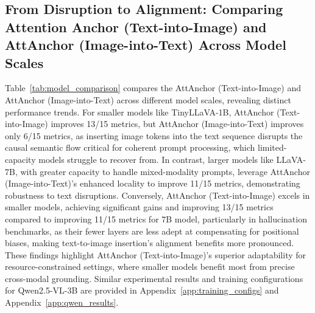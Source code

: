 \documentclass[11pt]{article}
\begin{document}
\subsection{From Disruption to Alignment: Comparing Attention Anchor (Text-into-Image) and AttAnchor (Image-into-Text) Across Model Scales}

Table~\ref{tab:model_comparison} compares the AttAnchor (Text-into-Image) and AttAnchor (Image-into-Text) across different model scales, revealing distinct performance trends. For smaller models like TinyLLaVA-1B, AttAnchor (Text-into-Image) improves 13/15 metrics, but AttAnchor (Image-into-Text) improves only 6/15 metrics, as inserting image tokens into the text sequence disrupts the causal semantic flow critical for coherent prompt processing, which limited-capacity models struggle to recover from. In contrast, larger models like LLaVA-7B, with greater capacity to handle mixed-modality prompts, leverage AttAnchor (Image-into-Text)'s enhanced locality to improve 11/15 metrics, demonstrating robustness to text disruptions. Conversely, AttAnchor (Text-into-Image) excels in smaller models, achieving significant gains and improving 13/15 metrics compared to improving 11/15 metrics for 7B model, particularly in hallucination benchmarks, as their fewer layers are less adept at compensating for positional biases, making text-to-image insertion’s alignment benefits more pronounced. These findings highlight AttAnchor (Text-into-Image)’s superior adaptability for resource-constrained settings, where smaller models benefit most from precise cross-modal grounding. Similar experimental results and training configurations for Qwen2.5-VL-3B are provided in Appendix~\ref{app:training_configs} and Appendix~\ref{app:qwen_results}.
\end{document}
